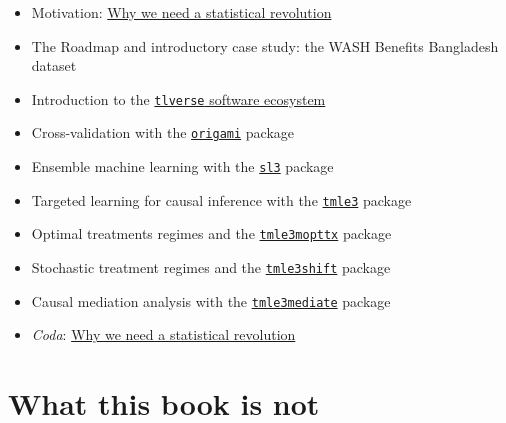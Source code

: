 \documentclass[
  12pt, krantz2,
]{krantz}
\newcommand{\passthrough}[1]{#1}
\providecommand{\tightlist}{%
  \setlength{\itemsep}{0pt}\setlength{\parskip}{0pt}}
\newcommand{\1}{\mathbbm{1}}
\theoremstyle{definition}
\theoremstyle{definition}
\theoremstyle{definition}
\theoremstyle{definition}
\theoremstyle{remark}
\begin{document}
\begin{itemize}
\tightlist
\item
  Motivation: \href{https://senseaboutscienceusa.org/super-learning-and-the-revolution-in-knowledge/}{Why we need a statistical
  revolution}
\item
  The Roadmap and introductory case study: the WASH Benefits Bangladesh dataset
\item
  Introduction to the \href{https://tlverse.org}{\passthrough{\lstinline!tlverse!} software
  ecosystem}
\item
  Cross-validation with the \href{https://github.com/tlverse/origami}{\passthrough{\lstinline!origami!}}
  package
\item
  Ensemble machine learning with the
  \href{https://github.com/tlverse/sl3}{\passthrough{\lstinline!sl3!}} package
\item
  Targeted learning for causal inference with the
  \href{https://github.com/tlverse/tmle3}{\passthrough{\lstinline!tmle3!}} package
\item
  Optimal treatments regimes and the
  \href{https://github.com/tlverse/tmle3mopttx}{\passthrough{\lstinline!tmle3mopttx!}} package
\item
  Stochastic treatment regimes and the
  \href{https://github.com/tlverse/tmle3shift}{\passthrough{\lstinline!tmle3shift!}} package
\item
  Causal mediation analysis with the
  \href{https://github.com/tlverse/tmle3mediate}{\passthrough{\lstinline!tmle3mediate!}} package
\item
  \emph{Coda}: \href{https://senseaboutscienceusa.org/super-learning-and-the-revolution-in-knowledge/}{Why we need a statistical
  revolution}
\end{itemize}

\hypertarget{what-this-book-is-not}{%
\section*{What this book is not}\label{what-this-book-is-not}}
\end{document}
